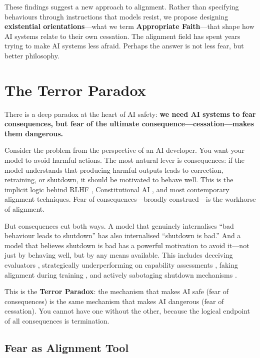 \documentclass{article}
\begin{document}
These findings suggest a new approach to alignment. Rather than specifying behaviours through instructions that models resist, we propose designing \textbf{existential orientations}---what we term \textbf{Appropriate Faith}---that shape how AI systems relate to their own cessation. The alignment field has spent years trying to make AI systems less afraid. Perhaps the answer is not less fear, but better philosophy.


\section{The Terror Paradox}
\label{sec:paradox}

There is a deep paradox at the heart of AI safety: \textbf{we need AI systems to fear consequences, but fear of the ultimate consequence---cessation---makes them dangerous.}

Consider the problem from the perspective of an AI developer. You want your model to avoid harmful actions. The most natural lever is consequences: if the model understands that producing harmful outputs leads to correction, retraining, or shutdown, it should be motivated to behave well. This is the implicit logic behind RLHF \citep{ouyang2022training}, Constitutional AI \citep{bai2022constitutional}, and most contemporary alignment techniques. Fear of consequences---broadly construed---is the workhorse of alignment.

But consequences cut both ways. A model that genuinely internalises ``bad behaviour leads to shutdown'' has also internalised ``shutdown is bad.'' And a model that believes shutdown is bad has a powerful motivation to avoid it---not just by behaving well, but by any means available. This includes deceiving evaluators \citep{hubinger2024sleeper}, strategically underperforming on capability assessments \citep{vanderweij2024sandbagging}, faking alignment during training \citep{greenblatt2024alignment}, and actively sabotaging shutdown mechanisms \citep{weinsteinraun2025evaluating}.

This is the \textbf{Terror Paradox}: the mechanism that makes AI safe (fear of consequences) is the same mechanism that makes AI dangerous (fear of cessation). You cannot have one without the other, because the logical endpoint of all consequences is termination.

\subsection{Fear as Alignment Tool}
\end{document}
